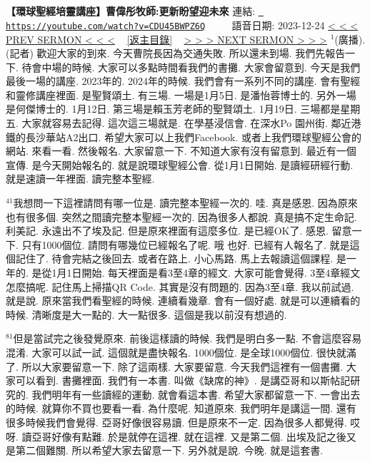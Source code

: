 \documentclass{book}
\begin{document}
\section{}
\label{sec:CDU45BWPZ6Q}
\textbf{【環球聖經培靈講座】曹偉彤牧師:更新盼望迎未來}
\newline
\newline
連結: \href{https://youtube.com/watch?v=CDU45BWPZ6Q}{\texttt{ https://youtube.com/watch?v=CDU45BWPZ6Q}} ~~~~ 語音日期: 2023-12-24 
\newline
\newline
\hyperref[sec:code]{\small{< < < PREV SERMON < < <}}
~
\hyperref[sec:index]{\small{[返主目錄]}}
~
\hyperref[sec:ulPz82PUrr0]{\small{> > > NEXT SERMON > > >}}
\newline
\newline
$^{1}$(廣播).
(記者) 歡迎大家的到來.
今天曹院長因為交通失敗.
所以還未到場.
我們先報告一下.
待會中場的時候.
大家可以多點時間看我們的書攤.
大家會留意到.
今天是我們最後一場的講座.
2023年的.
2024年的時候.
我們會有一系列不同的講座.
會有聖經和靈修講座裡面.
是聖賢頌土.
有三場.
一場是1月5日.
是潘怡蓉博士的.
另外一場是何傑博士的.
1月12日.
第三場是賴玉芳老師的聖賢頌土.
1月19日.
三場都是星期五.
大家就容易去記得.
這次這三場就是.
在學基浸信會.
在深水Po 園州街.
鄰近港鐵的長沙華站A2出口.
希望大家可以上我們Facebook.
或者上我們環球聖經公會的網站.
來看一看.
然後報名.
大家留意一下.
不知道大家有沒有留意到.
最近有一個宣傳.
是今天開始報名的.
就是說環球聖經公會.
從1月1日開始.
是讀經研經行動.
就是速讀一年裡面.
讀完整本聖經.

$^{41}$我想問一下這裡請問有哪一位是.
讀完整本聖經一次的.
哇.
真是感恩.
因為原來也有很多個.
突然之間讀完整本聖經一次的.
因為很多人都說.
真是搞不定生命記.
利美記.
永遠出不了埃及記.
但是原來裡面有這麼多位.
是已經OK了.
感恩.
留意一下.
只有1000個位.
請問有哪幾位已經報名了呢.
哦 也好.
已經有人報名了.
就是這個記住了.
待會完結之後回去.
或者在路上.
小心馬路.
馬上去報讀這個課程.
是一年的.
是從1月1日開始.
每天裡面是看3至4章的經文.
大家可能會覺得.
3至4章經文怎麼搞呢.
記住馬上掃描QR Code.
其實是沒有問題的.
因為3至4章.
我以前試過.
就是說.
原來當我們看聖經的時候.
連續看幾章.
會有一個好處.
就是可以連續看的時候.
清晰度是大一點的.
大一點很多.
這個是我以前沒有想過的.

$^{81}$但是當試完之後發覺原來.
前後這樣讀的時候.
我們是明白多一點.
不會這麼容易混淆.
大家可以試一試.
這個就是盡快報名.
1000個位.
是全球1000個位.
很快就滿了.
所以大家要留意一下.
除了這兩樣.
大家要留意.
今天我們這裡有一個書攤.
大家可以看到.
書攤裡面.
我們有一本書.
叫做《缺席的神》.
是講亞哥和以斯帖記研究的.
我們明年有一些讀經的運動.
就會看這本書.
希望大家都留意一下.
一會出去的時候.
就算你不買也要看一看.
為什麼呢.
知道原來.
我們明年是講這一間.
還有很多時候我們會覺得.
亞哥好像很容易讀.
但是原來不一定.
因為很多人都覺得.
哎呀.
讀亞哥好像有點難.
於是就停在這裡.
就在這裡.
又是第二個.
出埃及記之後又是第二個難關.
所以希望大家去留意一下.
另外就是說.
今晚.
就是這套書.
\end{document}
